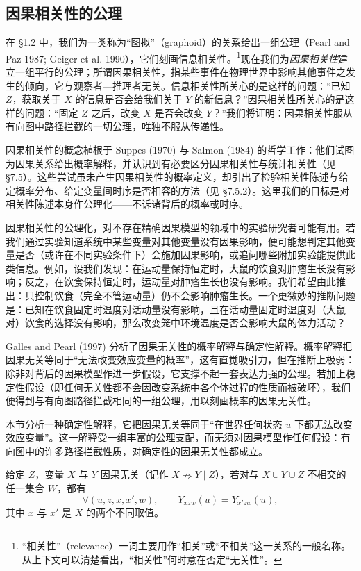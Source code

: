 \subsection{因果相关性的公理}

在 \S 1.2 中，我们为一类称为“图拟”（graphoid）的关系给出一组公理（Pearl and Paz 1987; Geiger et al. 1990），它们刻画信息相关性。\footnote{“相关性”（relevance）一词主要用作“相关”或“不相关”这一关系的一般名称。从上下文可以清楚看出，“相关性”何时意在否定“无关性”。}现在我们为\emph{因果相关性}建立一组平行的公理；所谓因果相关性，指某些事件在物理世界中影响其他事件之发生的倾向，它与观察者—推理者无关。信息相关性所关心的是这样的问题：“已知 $Z$，获取关于 $X$ 的信息是否会给我们关于 $Y$ 的新信息？”因果相关性所关心的是这样的问题：“固定 $Z$ 之后，改变 $X$ 是否会改变 $Y$？”我们将证明：因果相关性服从有向图中路径拦截的一切公理，唯独不服从传递性。

因果相关性的概念植根于 Suppes (1970) 与 Salmon (1984) 的哲学工作：他们试图为因果关系给出概率解释，并认识到有必要区分因果相关性与统计相关性（见 \S 7.5）。这些尝试虽未产生因果相关性的概率定义，却引出了检验相关性陈述与给定概率分布、给定变量间时序是否相容的方法（见 \S 7.5.2）。这里我们的目标是对相关性陈述本身作公理化——不诉诸背后的概率或时序。

因果相关性的公理化，对不存在精确因果模型的领域中的实验研究者可能有用。若我们通过实验知道系统中某些变量对其他变量没有因果影响，便可能想判定其他变量是否（或许在不同实验条件下）会施加因果影响，或追问哪些附加实验能提供此类信息。例如，设我们发现：在运动量保持恒定时，大鼠的饮食对肿瘤生长没有影响；反之，在饮食保持恒定时，运动量对肿瘤生长也没有影响。我们希望由此推出：只控制饮食（完全不管运动量）仍不会影响肿瘤生长。一个更微妙的推断问题是：已知在饮食固定时温度对活动量没有影响，且在活动量固定时温度对（大鼠对）饮食的选择没有影响，那么改变笼中环境温度是否会影响大鼠的体力活动？

Galles and Pearl (1997) 分析了因果无关性的概率解释与确定性解释。概率解释把因果无关等同于“无法改变效应变量的概率”，这有直觉吸引力，但在推断上极弱：除非对背后的因果模型作进一步假设，它支撑不起一套表达力强的公理。若加上稳定性假设（即任何无关性都不会因改变系统中各个体过程的性质而被破坏），我们便得到与有向图路径拦截相同的一组公理，用以刻画概率的因果无关性。

本节分析一种确定性解释，它把因果无关等同于“在世界任何状态 $u$ 下都无法改变效应变量”。这一解释受一组丰富的公理支配，而无须对因果模型作任何假设：有向图中的许多路径拦截性质，对确定性的因果无关性都成立。

\begin{definition}[因果无关性]
给定 $Z$，变量 $X$ 与 $Y$ 因果无关（记作 $X\nRightarrow Y\mid Z$），若对与 $X\cup Y\cup Z$ 不相交的任一集合 $W$，都有
\begin{equation}
\forall(u,z,x,x',w),\qquad Y_{xzw}(u)=Y_{x'zw}(u), \tag{7.38}
\end{equation}
其中 $x$ 与 $x'$ 是 $X$ 的两个不同取值。
\end{definition}

